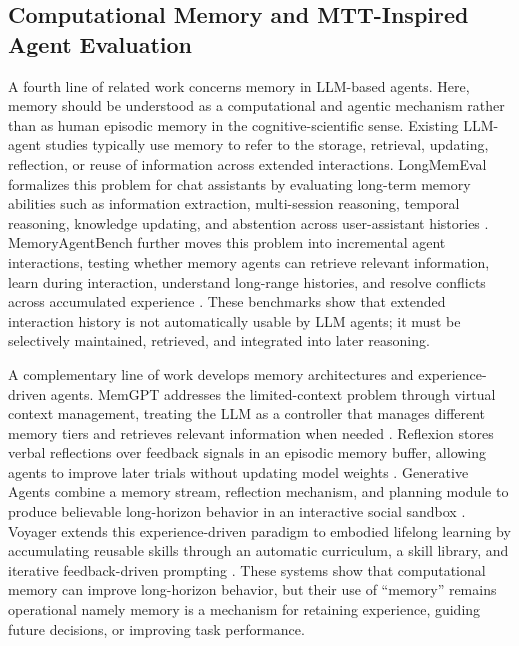 \documentclass[pdflatex,sn-mathphys-num]{sn-jnl}%
\theoremstyle{thmstyleone}%
\theoremstyle{thmstyletwo}%
\theoremstyle{thmstylethree}%
\begin{document}
\subsection{Computational Memory and MTT-Inspired Agent Evaluation}
A fourth line of related work concerns memory in LLM-based agents. Here, memory should be understood as a computational and agentic mechanism rather than as human episodic memory in the cognitive-scientific sense. Existing LLM-agent studies typically use memory to refer to the storage, retrieval, updating, reflection, or reuse of information across extended interactions. LongMemEval formalizes this problem for chat assistants by evaluating long-term memory abilities such as information extraction, multi-session reasoning, temporal reasoning, knowledge updating, and abstention across user-assistant histories \cite{wu2024longmemeval}. MemoryAgentBench further moves this problem into incremental agent interactions, testing whether memory agents can retrieve relevant information, learn during interaction, understand long-range histories, and resolve conflicts across accumulated experience \cite{hu2025evaluating}. These benchmarks show that extended interaction history is not automatically usable by LLM agents; it must be selectively maintained, retrieved, and integrated into later reasoning.

A complementary line of work develops memory architectures and experience-driven agents. MemGPT addresses the limited-context problem through virtual context management, treating the LLM as a controller that manages different memory tiers and retrieves relevant information when needed \cite{packer2023memgpt}. Reflexion stores verbal reflections over feedback signals in an episodic memory buffer, allowing agents to improve later trials without updating model weights \cite{shinn2023reflexion}. Generative Agents combine a memory stream, reflection mechanism, and planning module to produce believable long-horizon behavior in an interactive social sandbox \cite{park2023generative}. Voyager extends this experience-driven paradigm to embodied lifelong learning by accumulating reusable skills through an automatic curriculum, a skill library, and iterative feedback-driven prompting \cite{wang2023voyager}. These systems show that computational memory can improve long-horizon behavior, but their use of ``memory'' remains operational namely memory is a mechanism for retaining experience, guiding future decisions, or improving task performance.
\end{document}
